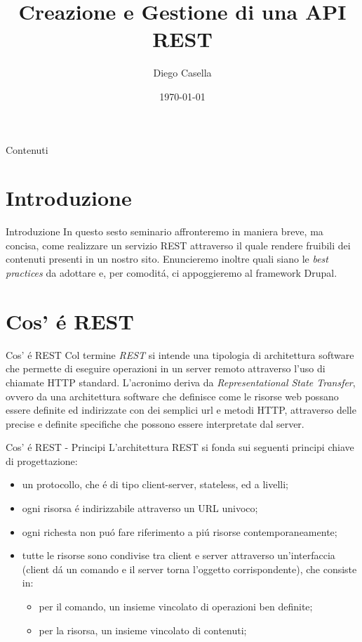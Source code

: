 \documentclass{beamer}
\title{Creazione e Gestione di una API REST}
\author{Diego Casella}
\date{\today}
\begin{document}
\maketitle


\begin{frame}{Contenuti} %
\tableofcontents
\end{frame}

\section{Introduzione}
\begin{frame}{Introduzione}
In questo sesto seminario affronteremo in maniera breve, ma concisa, come realizzare un servizio REST attraverso il quale rendere fruibili dei
contenuti presenti in un nostro sito.
\newline
Enuncieremo inoltre quali siano le \emph{best practices} da adottare e, per comodit\'a, ci appoggieremo al framework Drupal.
\end{frame}

%
\section{Cos'	\'e REST}
\begin{frame}{Cos'	\'e REST}
Col termine \emph{REST} si intende una tipologia di architettura software che permette di eseguire operazioni in un server
remoto attraverso l'uso di chiamate HTTP standard. L'acronimo deriva da \emph{Representational State Transfer}, ovvero
da una architettura software che definisce come le risorse web possano essere definite ed indirizzate con dei semplici url
e metodi HTTP, attraverso delle precise e definite specifiche che possono essere interpretate dal server.
\end{frame}


\begin{frame}{Cos'	\'e REST - Principi}
L'architettura REST si fonda sui seguenti principi chiave di progettazione:
\begin{itemize}
\item un protocollo, che \'e di tipo client-server, stateless, ed a livelli;
\item ogni risorsa \'e indirizzabile attraverso un URL univoco;
\item ogni richesta non pu\'o fare riferimento a pi\'u risorse contemporaneamente;
\item tutte le risorse sono condivise tra client e server attraverso un'interfaccia (client d\'a un comando e il server torna l'oggetto corrispondente), che consiste in:
\begin{itemize}
\item per il comando, un insieme vincolato di operazioni ben definite;
\item per la risorsa, un insieme vincolato di contenuti;
\end{itemize}
\end{itemize}
\end{frame}
\end{document}
